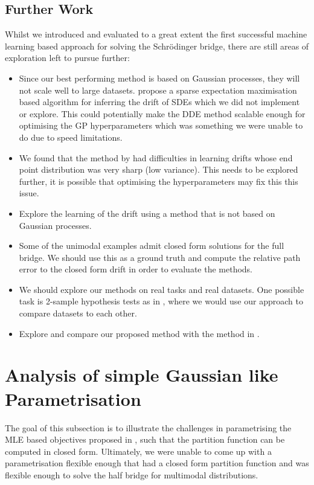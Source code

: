 \documentclass[a4paper,12pt,twoside,openright]{report}
\theoremstyle{definition}
\begin{document}
\section{Further Work}

Whilst we introduced and evaluated to a great extent the first successful machine learning based approach for solving the Schrödinger bridge, there are still areas of exploration left to pursue further:

\begin{itemize}
    \item Since our best performing method is based on Gaussian processes, they will not scale well to large datasets. \cite{ruttor2013approximate} propose a sparse expectation maximisation based algorithm for inferring the drift of SDEs which we did not implement or explore. This could potentially make the DDE method scalable enough for optimising the GP hyperparameters which was something we were unable to do due to speed limitations.
    \item We found that the method by \cite{ruttor2013approximate} had difficulties in learning drifts whose end point distribution was very sharp (low variance). This needs to be explored further, it is possible that optimising the hyperparameters may fix this this issue.  
    \item Explore the learning of the drift using a method that is not based on Gaussian processes.
    \item Some of the unimodal examples admit closed form solutions for the full bridge. We should use this as a ground truth and compute the relative path error to the closed form drift in order to evaluate the methods.
    \item We should explore our methods on real tasks and real datasets. One possible task is 2-sample hypothesis tests as in \cite{gretton2012kernel}, where we would use our approach to compare datasets to each other. 
    \item Explore and compare our proposed method with the method in \cite{bernton2019schr}.
\end{itemize}

\appendix


\singlespacing

\chapter{Analysis of simple Gaussian like Parametrisation}\label{app:bad_gauss}

The goal of this subsection is to illustrate the challenges in parametrising the MLE based objectives proposed in \cite{pavon2018data}, such that the partition function can be computed in closed form. Ultimately, we were unable to come up with a parametrisation flexible enough that had a closed form partition function and was flexible enough to solve the half bridge for multimodal distributions.
\end{document}
